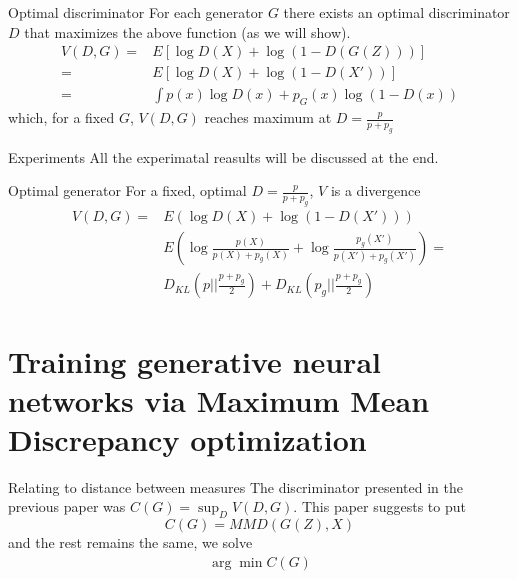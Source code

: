 \documentclass{beamer}
\begin{document}
\begin{frame}{Optimal discriminator}
For each generator  $G$ there exists an optimal  discriminator $D$ that maximizes the above function (as we will show).
\begin{align}
V(D,G) =& E \left[ \log D(X) +  \log(1 - D(G(Z)))  \right] \\ 
       =& E\left[  \log D(X) +  \log(1 - D(X')) \right] \\
       =& \int p(x)  \log D(x) +  p_G(x) \log(1 - D(x))
\end{align}
which, for a fixed $G$, $V(D,G)$ reaches  maximum  at $D = \frac{p}{p+p_g}$


\end{frame}
\begin{frame}{Experiments}
All the experimatal reasults will be discussed at the end.
 
\end{frame}


  
\begin{frame}{Optimal generator }
For a fixed, optimal $D = \frac{p}{p+p_g} $, $V$ is a divergence 
\begin{align}
V(D,G) =& E \left(  \log D(X) + \log(1 - D(X')) \right) \\ 
&E \left(   \log \frac{p(X)}{p(X)+p_g(X)} + \log \frac{p_g(X')}{p(X')+p_g(X')} \right) =\\
&D_{KL}(p || \frac{p+p_g}{2} ) + D_{KL}(p_g ||  \frac{p+p_g}{2})
\end{align}

\end{frame}  


\section{Training generative neural networks via Maximum Mean Discrepancy optimization}

\begin{frame}{Relating to distance between measures}
The discriminator presented in the previous paper was $C(G) = \sup_{D} V(D,G)$. This paper suggests to put 
\[
 C(G) = MMD(G(Z),X) 
\]
and the rest remains the same, we solve 
\begin{align}
\arg \min C(G)
\end{align}
\end{frame}
\end{document}

